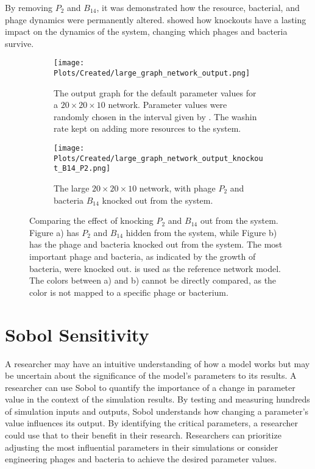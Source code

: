 By removing $P_2$ and $B_{14}$, it was demonstrated how the resource, bacterial, and phage dynamics were permanently altered. 
 showed how knockouts have a lasting impact on the dynamics of the system, changing which phages and bacteria survive. 

\begin{figure}
    \centering
    \begin{subfigure}{1\linewidth}
        \centering
        \texttt{[image: Plots/Created/large\_graph\_network\_output.png]}
        \caption{
            The output graph for the default parameter values for a $20\times 20 \times 10$ network. 
            Parameter values were randomly chosen in the interval given by . 
            The washin rate kept on adding more resources to the system. 
        }
        \label{fig:created:large_graph_network_output}
    \end{subfigure}
    \hfill
    \begin{subfigure}{1\linewidth}
        \centering
        \texttt{[image: Plots/Created/large\_graph\_network\_output\_knockout\_B14\_P2.png]}
        \caption{
            The large $20\times 20\times 10$ network, with phage $P_2$ and bacteria $B_{14}$ knocked out from the system.
        }
        \label{fig:created:large_graph_network_output_knockout_B14_P2}
    \end{subfigure}
    \caption{
        Comparing the effect of knocking $P_2$ and $B_{14}$ out from the system. 
        Figure a) has $P_2$ and $B_{14}$ hidden from the system, while Figure b) has the phage and bacteria knocked out from the system. 
        The most important phage and bacteria, as indicated by the growth of bacteria, were knocked out. 
         is used as the reference network model. 
        The colors between a) and b) cannot be directly compared, as the color is not mapped to a specific phage or bacterium. 
    }
\end{figure}

\section{Sobol Sensitivity}
A researcher may have an intuitive understanding of how a model works but may be uncertain about the significance of the model's parameters to its results.  
A researcher can use Sobol to quantify the importance of a change in parameter value in the context of the simulation results. 
By testing and measuring hundreds of simulation inputs and outputs, Sobol understands how changing a parameter's value influences its output. 
By identifying the critical parameters, a researcher could use that to their benefit in their research. 
Researchers can prioritize adjusting the most influential parameters in their simulations or consider engineering phages and bacteria to achieve the desired parameter values.

